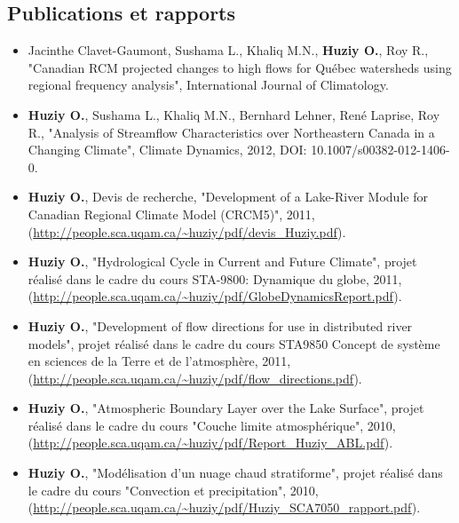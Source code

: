 \documentclass[12pt,a4paper,sans]{moderncv} %
\begin{document}
\subsection{Publications et rapports}
\vspace{0.5cm}
\begin{itemize}
  
    \item Jacinthe Clavet-Gaumont, Sushama L., Khaliq M.N.,
    \textbf{Huziy O.}, Roy R., "Canadian RCM projected changes to high
    flows for Québec watersheds using regional frequency analysis", International Journal of Climatology.
    
    \item \textbf{Huziy O.}, Sushama L., Khaliq M.N., Bernhard
    Lehner, René Laprise, Roy R., "Analysis of Streamflow Characteristics over Northeastern Canada 
     in a Changing Climate", Climate Dynamics, 2012, DOI:
     10.1007/s00382-012-1406-0.

   
    \item \textbf{Huziy O.}, Devis de recherche, "Development of a
    Lake-River Module for Canadian Regional Climate Model (CRCM5)", 2011,
    (\url{http://people.sca.uqam.ca/~huziy/pdf/devis_Huziy.pdf}).
   
    \item \textbf{Huziy O.}, "Hydrological Cycle in Current and Future Climate",
    projet réalisé dans le cadre du cours STA-9800: Dynamique du globe, 2011,\\
     (\url{http://people.sca.uqam.ca/~huziy/pdf/GlobeDynamicsReport.pdf}).
   
    \item \textbf{Huziy O.}, "Development of flow directions for use in
    distributed river models", projet réalisé dans le cadre du cours STA9850
    Concept de système en sciences de la Terre et de l'atmosphère, 2011,
    (\url{http://people.sca.uqam.ca/~huziy/pdf/flow_directions.pdf}).
   
    \item \textbf{Huziy O.}, "Atmospheric Boundary Layer over the Lake Surface",
           projet réalisé dans le cadre du cours "Couche limite atmosphérique",
           2010, (\url{http://people.sca.uqam.ca/~huziy/pdf/Report_Huziy_ABL.pdf}).
   
    \item \textbf{Huziy O.}, "Modélisation d’un nuage chaud stratiforme",
       projet réalisé dans le cadre du cours "Convection et precipitation", 2010,
       (\url{http://people.sca.uqam.ca/~huziy/pdf/Huziy_SCA7050_rapport.pdf}).


\end{itemize}
\end{document}
